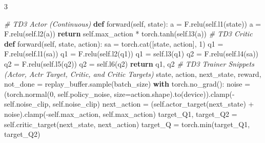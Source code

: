 \documentclass{article}
\makeatletter
\newenvironment{Shaded}{\CodeFontSize\setlength{\topsep}{\CodeBlockSkip}\setlength{\partopsep}{0pt}}{}
\newcommand{\BuiltInTok}[1]{\textcolor[rgb]{0.00,0.50,0.00}{#1}}
\newcommand{\CommentTok}[1]{\textcolor[rgb]{0.38,0.63,0.69}{\textit{#1}}}
\newcommand{\ControlFlowTok}[1]{\textcolor[rgb]{0.00,0.44,0.13}{\textbf{#1}}}
\newcommand{\DecValTok}[1]{\textcolor[rgb]{0.25,0.63,0.44}{#1}}
\newcommand{\KeywordTok}[1]{\textcolor[rgb]{0.00,0.44,0.13}{\textbf{#1}}}
\newcommand{\NormalTok}[1]{#1}
\newcommand{\OperatorTok}[1]{\textcolor[rgb]{0.40,0.40,0.40}{#1}}
\newcommand{\VariableTok}[1]{\textcolor[rgb]{0.10,0.09,0.49}{#1}}
\newcommand{\SectionFontStyle}{\fontsize{6.4}{7.2}\selectfont\bfseries}
\newcommand{\CodeFontSize}{\fontsize{4.8}{5.6}\selectfont}
\newcommand{\NumColumns}{3}  %
\newlength{\SectionBeforeSkip}
\newlength{\SectionAfterSkip}
\newlength{\CodeBlockSkip}
\renewcommand\section{\@startsection{section}{1}{\z@}{\SectionBeforeSkip}{\SectionAfterSkip}{\normalfont\SectionFontStyle}}
\makeatother
\begin{document}
\begin{multicols*}{\NumColumns}
\section{Assignment 3}\label{assignment-3}

\begin{Shaded}
\begin{Highlighting}[]
\CommentTok{\# TD3 Actor (Continuous)}
\KeywordTok{def}\NormalTok{ forward(}\VariableTok{self}\NormalTok{, state):}
\NormalTok{  a }\OperatorTok{=}\NormalTok{ F.relu(}\VariableTok{self}\NormalTok{.l1(state))}
\NormalTok{  a }\OperatorTok{=}\NormalTok{ F.relu(}\VariableTok{self}\NormalTok{.l2(a))}
  \ControlFlowTok{return} \VariableTok{self}\NormalTok{.max\_action }\OperatorTok{*}\NormalTok{ torch.tanh(}\VariableTok{self}\NormalTok{.l3(a))}
\CommentTok{\# TD3 Critic}
\KeywordTok{def}\NormalTok{ forward(}\VariableTok{self}\NormalTok{, state, action):}
\NormalTok{    sa }\OperatorTok{=}\NormalTok{ torch.cat([state, action], }\DecValTok{1}\NormalTok{)}
\NormalTok{    q1 }\OperatorTok{=}\NormalTok{ F.relu(}\VariableTok{self}\NormalTok{.l1(sa))}
\NormalTok{    q1 }\OperatorTok{=}\NormalTok{ F.relu(}\VariableTok{self}\NormalTok{.l2(q1))}
\NormalTok{    q1 }\OperatorTok{=} \VariableTok{self}\NormalTok{.l3(q1)}
\NormalTok{    q2 }\OperatorTok{=}\NormalTok{ F.relu(}\VariableTok{self}\NormalTok{.l4(sa))}
\NormalTok{    q2 }\OperatorTok{=}\NormalTok{ F.relu(}\VariableTok{self}\NormalTok{.l5(q2))}
\NormalTok{    q2 }\OperatorTok{=} \VariableTok{self}\NormalTok{.l6(q2)}
    \ControlFlowTok{return}\NormalTok{ q1, q2}
\CommentTok{\# TD3 Trainer Snippets (Actor, Actr Target, Critic, and Critic Targets)}
\NormalTok{state, action, next\_state, reward, not\_done }\OperatorTok{=}\NormalTok{ replay\_buffer.sample(batch\_size)}
\ControlFlowTok{with}\NormalTok{ torch.no\_grad():}
\NormalTok{  noise }\OperatorTok{=}\NormalTok{ (torch.normal(}\DecValTok{0}\NormalTok{, }\VariableTok{self}\NormalTok{.policy\_noise, size}\OperatorTok{=}\NormalTok{action.shape).to(device)).clamp(}\OperatorTok{{-}}\VariableTok{self}\NormalTok{.noise\_clip, }\VariableTok{self}\NormalTok{.noise\_clip)}
\NormalTok{  next\_action }\OperatorTok{=}\NormalTok{ (}\VariableTok{self}\NormalTok{.actor\_target(next\_state) }\OperatorTok{+}\NormalTok{ noise).clamp(}\OperatorTok{{-}}\VariableTok{self}\NormalTok{.max\_action, }\VariableTok{self}\NormalTok{.max\_action)}
\NormalTok{  target\_Q1, target\_Q2 }\OperatorTok{=} \VariableTok{self}\NormalTok{.critic\_target(next\_state, next\_action)}
\NormalTok{  target\_Q }\OperatorTok{=}\NormalTok{ torch.}\BuiltInTok{min}\NormalTok{(target\_Q1, target\_Q2)}

\end{Highlighting}
\end{Shaded}
\end{multicols*}
\end{document}
